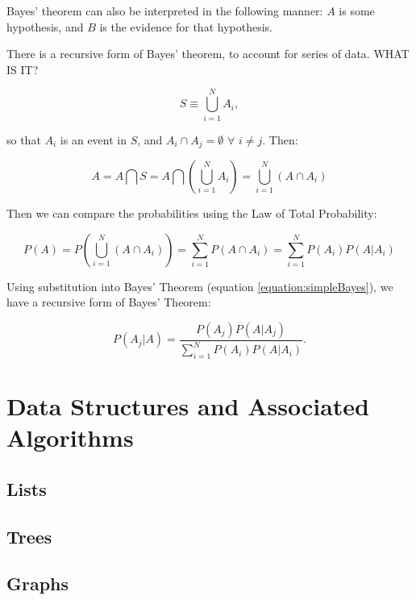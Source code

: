 \documentclass[
10pt, %
a4paper, %
oneside, %
headinclude,footinclude, %
BCOR5mm, %
]{scrartcl}
\begin{document}
Bayes' theorem can also be interpreted in the following manner: $A$ is some hypothesis, and $B$ is the evidence for that hypothesis. 

There is a recursive form of Bayes' theorem, to account for series of data. WHAT IS IT?


\begin{equation}
S \equiv \bigcup_{i=1}^{N} A_{i},
\end{equation}

so that $A_{i}$ is an event in $S$, and $A_{i} \cap A_{j} = \emptyset$ $\forall$ $i \not= j$. Then:

\begin{equation}
A = A \bigcap S = A \bigcap ( \bigcup_{i=1}^{N} A_{i} ) = \bigcup_{i=1}^{N} (A \cap A_{i})
\end{equation}

Then we can compare the probabilities using the Law of Total Probability:

\begin{equation}
P(A) = P(\bigcup_{i=1}^{N} (A \cap A_{i}))=\sum_{i=1}^{N} P(A \cap A_{i}) = \sum_{i=1}^{N} P(A_{i}) P(A|A_{i})
\end{equation}

Using substitution into Bayes' Theorem (equation \ref{equation:simpleBayes}), we have a recursive form of Bayes' Theorem:

\begin{equation}
P(A_{j} | A) = \frac{P(A_{j}) P(A | A_{j})}{\sum_{i=1}^{N} P(A_{i}) P(A|A_{i})}.
\end{equation}


\section{Data Structures and Associated Algorithms}
\subsection{Lists}
\subsection{Trees}
\subsection{Graphs}
\end{document}
